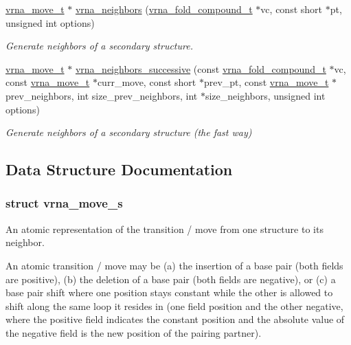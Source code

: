 \begin{DoxyCompactItemize}
\mbox{\hyperlink{group__neighbors_ga08630e00206cd163ea29c462bf5f4755}{vrna\+\_\+move\+\_\+t}} $\ast$ \mbox{\hyperlink{group__neighbors_gab1473d856b15da2120fe648977798ad5}{vrna\+\_\+neighbors}} (\mbox{\hyperlink{group__fold__compound_ga1b0cef17fd40466cef5968eaeeff6166}{vrna\+\_\+fold\+\_\+compound\+\_\+t}} $\ast$vc, const short $\ast$pt, unsigned int options)
\begin{DoxyCompactList}\small\item\em Generate neighbors of a secondary structure. \end{DoxyCompactList}\item 
\mbox{\hyperlink{group__neighbors_ga08630e00206cd163ea29c462bf5f4755}{vrna\+\_\+move\+\_\+t}} $\ast$ \mbox{\hyperlink{group__neighbors_gae5aaa1c5a1f22e889843f3edbdd04714}{vrna\+\_\+neighbors\+\_\+successive}} (const \mbox{\hyperlink{group__fold__compound_ga1b0cef17fd40466cef5968eaeeff6166}{vrna\+\_\+fold\+\_\+compound\+\_\+t}} $\ast$vc, const \mbox{\hyperlink{group__neighbors_ga08630e00206cd163ea29c462bf5f4755}{vrna\+\_\+move\+\_\+t}} $\ast$curr\+\_\+move, const short $\ast$prev\+\_\+pt, const \mbox{\hyperlink{group__neighbors_ga08630e00206cd163ea29c462bf5f4755}{vrna\+\_\+move\+\_\+t}} $\ast$prev\+\_\+neighbors, int size\+\_\+prev\+\_\+neighbors, int $\ast$size\+\_\+neighbors, unsigned int options)
\begin{DoxyCompactList}\small\item\em Generate neighbors of a secondary structure (the fast way) \end{DoxyCompactList}\end{DoxyCompactItemize}


\subsection{Data Structure Documentation}
\label{structvrna__move__s}
\subsubsection{struct vrna\+\_\+move\+\_\+s}
An atomic representation of the transition / move from one structure to its neighbor. 

An atomic transition / move may be (a) the insertion of a base pair (both fields are positive), (b) the deletion of a base pair (both fields are negative), or (c) a base pair shift where one position stays constant while the other is allowed to shift along the same loop it resides in (one field position and the other negative, where the positive field indicates the constant position and the absolute value of the negative field is the new position of the pairing partner).

